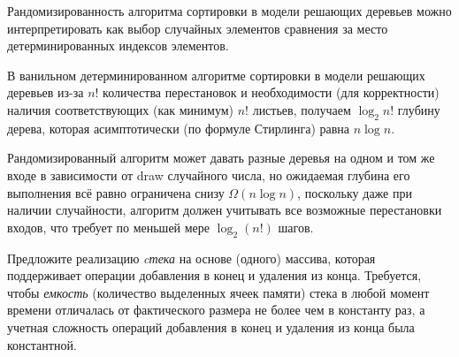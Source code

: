 \documentclass[11pt]{article}
\begin{document}
\begin{problem}{30}
\begin{enumerate}
	      \begin{solution}
		      Рандомизированность алгоритма сортировки в модели решающих деревьев можно интерпретировать как выбор случайных элементов сравнения за место детерминированных индексов элементов.

		      В ванильном детерминированном алгоритме сортировки в модели решающих деревьев из-за $ n! $ количества перестановок и необходимости (для корректности) наличия соответствующих (как минимум) $ n! $ листьев, получаем $ \log_2 n! $ глубину дерева, которая асимптотически (по формуле Стирлинга) равна $ n \log n $.

		      Рандомизированный алгоритм может давать разные деревья на одном и том же входе в зависимости от draw случайного числа, но ожидаемая глубина его выполнения всё равно ограничена снизу $\Omega(n \log n)$, поскольку даже при наличии случайности, алгоритм должен учитывать все возможные перестановки входов, что требует по меньшей мере $ \log_2 (n!) $ шагов.
	      \end{solution}
\end{enumerate}
\end{problem}

\begin{problem}{20}
Предложите реализацию \emph{cтека} на основе (одного) массива, которая поддерживает операции добавления в конец и удаления из конца. Требуется, чтобы \emph{емкость} (количество выделенных ячеек памяти) стека в любой момент времени отличалась от фактического размера не более чем в константу раз, а учетная сложность операций добавления в конец и удаления из конца была константной.
\end{problem}
\end{document}

